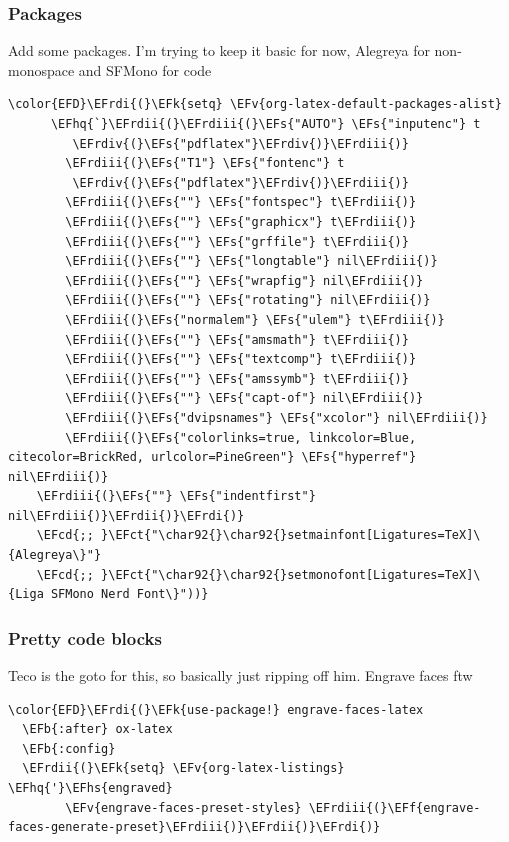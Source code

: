 \documentclass{scrartcl}
\newcommand{\EFk}[1]{\textcolor{EFk}{#1}} %
\newcommand{\EFs}[1]{\textcolor{EFs}{#1}} %
\newcommand{\EFb}[1]{\textcolor{EFb}{#1}} %
\newcommand{\EFct}[1]{\textcolor{EFct}{#1}} %
\newcommand{\EFv}[1]{\textcolor{EFv}{#1}} %
\newcommand{\EFf}[1]{\textcolor{EFf}{#1}} %
\newcommand{\EFcd}[1]{\textcolor{EFcd}{#1}} %
\newcommand{\EFhq}[1]{#1} %
\newcommand{\EFhs}[1]{#1} %
\newcommand{\EFrdi}[1]{#1} %
\newcommand{\EFrdii}[1]{#1} %
\newcommand{\EFrdiii}[1]{#1} %
\newcommand{\EFrdiv}[1]{#1} %
\begin{document}
\subsubsection{Packages}
\label{sec:orgd51df50}
Add some packages. I'm trying to keep it basic for now, Alegreya for
non-monospace and SFMono for code
\begin{Code}
\begin{Verbatim}[]
\color{EFD}\EFrdi{(}\EFk{setq} \EFv{org-latex-default-packages-alist}
      \EFhq{`}\EFrdii{(}\EFrdiii{(}\EFs{"AUTO"} \EFs{"inputenc"} t
         \EFrdiv{(}\EFs{"pdflatex"}\EFrdiv{)}\EFrdiii{)}
        \EFrdiii{(}\EFs{"T1"} \EFs{"fontenc"} t
         \EFrdiv{(}\EFs{"pdflatex"}\EFrdiv{)}\EFrdiii{)}
        \EFrdiii{(}\EFs{""} \EFs{"fontspec"} t\EFrdiii{)}
        \EFrdiii{(}\EFs{""} \EFs{"graphicx"} t\EFrdiii{)}
        \EFrdiii{(}\EFs{""} \EFs{"grffile"} t\EFrdiii{)}
        \EFrdiii{(}\EFs{""} \EFs{"longtable"} nil\EFrdiii{)}
        \EFrdiii{(}\EFs{""} \EFs{"wrapfig"} nil\EFrdiii{)}
        \EFrdiii{(}\EFs{""} \EFs{"rotating"} nil\EFrdiii{)}
        \EFrdiii{(}\EFs{"normalem"} \EFs{"ulem"} t\EFrdiii{)}
        \EFrdiii{(}\EFs{""} \EFs{"amsmath"} t\EFrdiii{)}
        \EFrdiii{(}\EFs{""} \EFs{"textcomp"} t\EFrdiii{)}
        \EFrdiii{(}\EFs{""} \EFs{"amssymb"} t\EFrdiii{)}
        \EFrdiii{(}\EFs{""} \EFs{"capt-of"} nil\EFrdiii{)}
        \EFrdiii{(}\EFs{"dvipsnames"} \EFs{"xcolor"} nil\EFrdiii{)}
        \EFrdiii{(}\EFs{"colorlinks=true, linkcolor=Blue, citecolor=BrickRed, urlcolor=PineGreen"} \EFs{"hyperref"} nil\EFrdiii{)}
    \EFrdiii{(}\EFs{""} \EFs{"indentfirst"} nil\EFrdiii{)}\EFrdii{)}\EFrdi{)}
    \EFcd{;; }\EFct{"\char92{}\char92{}setmainfont[Ligatures=TeX]\{Alegreya\}"}
    \EFcd{;; }\EFct{"\char92{}\char92{}setmonofont[Ligatures=TeX]\{Liga SFMono Nerd Font\}"))}
\end{Verbatim}
\end{Code}

\subsubsection{Pretty code blocks}
\label{sec:org9568829}
Teco is the goto for this, so basically just ripping off him. Engrave faces ftw
\begin{Code}
\begin{Verbatim}[]
\color{EFD}\EFrdi{(}\EFk{use-package!} engrave-faces-latex
  \EFb{:after} ox-latex
  \EFb{:config}
  \EFrdii{(}\EFk{setq} \EFv{org-latex-listings} \EFhq{'}\EFhs{engraved}
        \EFv{engrave-faces-preset-styles} \EFrdiii{(}\EFf{engrave-faces-generate-preset}\EFrdiii{)}\EFrdii{)}\EFrdi{)}
\end{Verbatim}
\end{Code}
\end{document}
